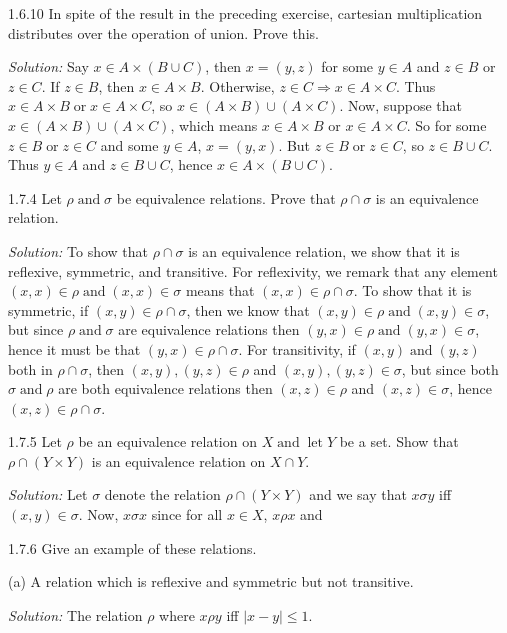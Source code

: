 \documentclass{letter}
\newcommand{\tmop}[1]{\ensuremath{\operatorname{#1}}}
\newcommand{\tmtextit}[1]{{\itshape{#1}}}
\begin{document}
1.6.10 In spite of the result in the preceding exercise, cartesian
multiplication distributes over the operation of union. Prove this.

\tmtextit{Solution:} Say $x \in A \times (B \cup C)$, then $x = (y, z)$ for
some $y \in A$ and $z \in B$ or $z \in C$. If $z \in B$, then $x \in A \times
B$. Otherwise, $z \in C \Rightarrow x \in A \times C$. Thus $x \in A \times B
\tmop{or} x \in A \times C$, so $x \in (A \times B) \cup (A \times C)$. Now,
suppose that $x \in (A \times B) \cup (A \times C)$, which means $x \in A
\times B$ or $x \in A \times C$. So for some $z \in B \tmop{or} z \in C$ and
some $y \in A$, $x = (y, x)$. But $z \in B \tmop{or} z \in C$, so $z \in B
\cup C$. Thus $y \in A$ and $z \in B \cup C$, hence $x \in A \times (B \cup
C)$.

1.7.4 Let $\rho \tmop{and} \sigma$ be equivalence relations. Prove that $\rho
\cap \sigma$ is an equivalence relation.

\tmtextit{Solution:} To show that $\rho \cap \sigma$ is an equivalence
relation, we show that it is reflexive, symmetric, and transitive. For
reflexivity, we remark that any element $(x, x) \in \rho \tmop{and} (x, x) \in
\sigma$ means that $(x, x) \in \rho \cap \sigma$. To show that it is
symmetric, if $(x, y) \in \rho \cap \sigma$, then we know that $(x, y) \in
\rho \tmop{and} (x, y) \in \sigma$, but since $\rho \tmop{and} \sigma$ are
equivalence relations then $(y, x) \in \rho \tmop{and} (y, x) \in \sigma$,
hence it must be that $(y, x) \in \rho \cap \sigma$. For transitivity, if $(x,
y) \tmop{and} (y, z)$ both in $\rho \cap \sigma$, then $(x, y), (y, z) \in
\rho$ and $(x, y), (y, z) \in \sigma$, but since both $\sigma \tmop{and} \rho$
are both equivalence relations then $(x, z) \in \rho$ and $(x, z) \in \sigma$,
hence $(x, z) \in \rho \cap \sigma$.

1.7.5 Let $\rho$ be an equivalence relation on $X \tmop{and} \tmop{let} Y$ be
a set. Show that $\rho \cap (Y \times Y)$ is an equivalence relation on $X
\cap Y$.

\tmtextit{Solution:} Let $\sigma$ denote the relation $\rho \cap (Y \times Y)$
and we say that $x \sigma y$ iff $(x, y) \in \sigma$. Now, $x \sigma x$ since
for all $x \in X$, $x \rho x$ and

1.7.6 Give an example of these relations.

(a) A relation which is reflexive and symmetric but not transitive.

\tmtextit{Solution:} The relation $\rho$ where $x \rho y$ iff $| x - y | \leq
1$.
\end{document}
